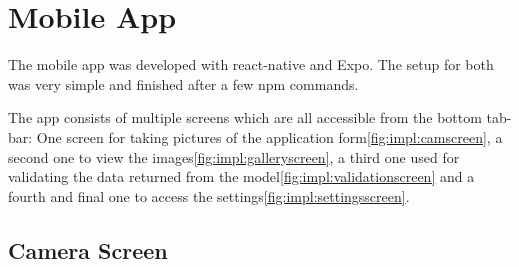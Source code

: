 %
%
%
%
%
%
%
%



\section{Mobile App}

The mobile app was developed with react-native and Expo. 
The setup for both was very simple and finished after a few npm commands.

The app consists of multiple screens which are all accessible from the bottom tab-bar:
One screen for taking pictures of the application form\ref{fig:impl:camscreen}, a second one to view the images\ref{fig:impl:galleryscreen}, a third one used for validating the data returned from the model\ref{fig:impl:validationscreen} and a fourth and final one to access the settings\ref{fig:impl:settingsscreen}.

\subsection{Camera Screen}


